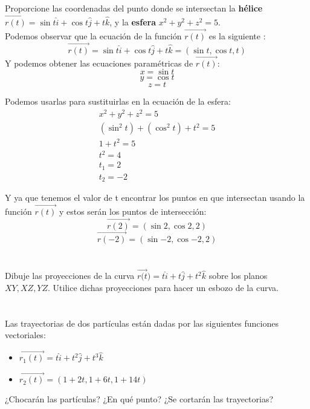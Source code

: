 \documentclass[12pt]{article}
\begin{document}
\section{}
Proporcione las coordenadas del punto donde se intersectan la \textbf{hélice} $\vec{r(t)}=\sin{t}\hat{i}+\cos{t}\hat{j}+t\hat{k}$, y la \textbf{esfera} $x^2+y^2+z^2=5$.\\
Podemos observar que la ecuación de la función $\vec{r(t)}$ es la siguiente :
\[
\vec{r(t)}=\sin{t}\hat{i}+\cos{t}\hat{j}+t\hat{k} = (\sin{t},\cos{t}, t )\]
Y podemos obtener las ecuaciones paramétricas de $\vec{r(t)}$:
\[ x =  \sin{t} \]
\[ y =  \cos{t} \]
\[ z =  t \]

Podemos usarlas para sustituirlas en la ecuación de la esfera:
 \begin{align*}
   x^2+y^2+z^2=5 \\
   (\sin^2{t}) + (\cos^2{t}) + t ^2 = 5 \\
   1+ t ^2 = 5 \\
   t ^2 = 4 \\
   t_1 = 2 \\
   t_2 = -2
 \end{align*}

 Y ya que tenemos el valor de t encontrar los puntos en que intersectan usando la función $\vec{r(t)}$ y estos serán los puntos de intersección:
\[
\vec{r(2)} = (\sin{2},\cos{2}, 2 )
\]
\[
\vec{r(-2)}= (\sin{-2},\cos{-2}, 2 )
\]
\section{}
Dibuje las proyecciones de la curva $\vec{r(t})=t\hat{i}+t\hat{j}+t^2\hat{k}$ sobre los planos $XY , XZ, YZ$. Utilice dichas proyecciones para hacer un esbozo de la curva.

\section{}
Las trayectorias de dos partículas están dadas por las siguientes funciones vectoriales:
\begin{itemize}[format=\textbf]

\item $\vec{r_1(t)}=t\hat{i}+t^2\hat{j}+t^3\hat{k}$

\item $\vec{r_2(t)}=(1+2t,1+6t,1+14t)$

\end{itemize}
¿Chocarán las partículas? ¿En qué punto? ¿Se cortarán las trayectorias?
\end{document}
